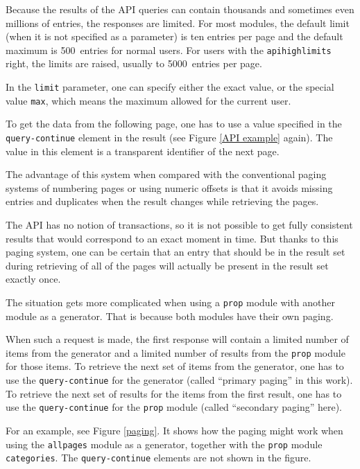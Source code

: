 Because the results of the \ac{API} queries can contain thousands and sometimes even millions of entries,
the responses are limited.
For most modules, the default limit (when it is not specified as a parameter) is ten entries per page
and the default maximum is 500~entries for normal users.
For users with the \texttt{apihighlimits} right, the limits are raised, usually to 5000~entries per page.

In the \texttt{limit} parameter, one can specify either the exact value,
or the special value \texttt{max}, which means the maximum allowed for the current user.

To get the data from the following page, one has to use a value specified in the \texttt{query-continue}
element in the result (see Figure \ref{API example} again).
The value in this element is a transparent identifier of the next page.

The advantage of this system when compared with the conventional paging systems of numbering pages
or using numeric offsets is that it avoids missing entries and duplicates when the result
changes while retrieving the pages.

The \ac{API} has no notion of transactions, so it is not possible to get fully consistent results
that would correspond to an exact moment in time.
But thanks to this paging system, one can be certain that an entry that should be in the result set
during retrieving of all of the pages will actually be present in the result set exactly once.

\medskip

The situation gets more complicated when using a \texttt{prop} module with another module as a generator.
That is because both modules have their own paging.

When such a request is made, the first response will contain a limited number of items from the generator
and a limited number of results from the \texttt{prop} module for those items.
To retrieve the next set of items from the generator, one has to use the \texttt{query-continue} for the generator
(called “primary paging” in this work).
To retrieve the next set of results for the items from the first result,
one has to use the \texttt{query-continue} for the \texttt{prop} module (called “secondary paging” here).

For an example, see Figure \ref{paging}.
It shows how the paging might work when using the \texttt{allpages} module as a generator,
together with the \texttt{prop} module \texttt{categories}.
The \texttt{query-continue} elements are not shown in the figure.

